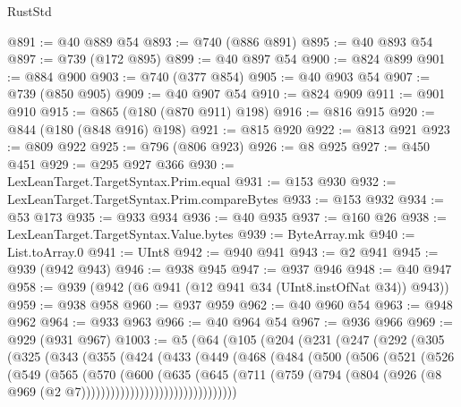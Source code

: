 \begin{lexlean}{RustStd}
\begin{coremodule}
@891 := @40 @889 @54
@893 := @740 (@886 @891)
@895 := @40 @893 @54
@897 := @739 (@172 @895)
@899 := @40 @897 @54
@900 := @824 @899
@901 := @884 @900
@903 := @740 (@377 @854)
@905 := @40 @903 @54
@907 := @739 (@850 @905)
@909 := @40 @907 @54
@910 := @824 @909
@911 := @901 @910
@915 := @865 (@180 (@870 @911) @198)
@916 := @816 @915
@920 := @844 (@180 (@848 @916) @198)
@921 := @815 @920
@922 := @813 @921
@923 := @809 @922
@925 := @796 (@806 @923)
@926 := @8 @925
@927 := @450 @451
@929 := @295 @927 @366
@930 := LexLeanTarget.TargetSyntax.Prim.equal
@931 := @153 @930
@932 := LexLeanTarget.TargetSyntax.Prim.compareBytes
@933 := @153 @932
@934 := @53 @173
@935 := @933 @934
@936 := @40 @935
@937 := @160 @26
@938 := LexLeanTarget.TargetSyntax.Value.bytes
@939 := ByteArray.mk
@940 := List.toArray.{0}
@941 := UInt8
@942 := @940 @941
@943 := @2 @941
@945 := @939 (@942 @943)
@946 := @938 @945
@947 := @937 @946
@948 := @40 @947
@958 := @939 (@942 (@6 @941 (@12 @941 @34 (UInt8.instOfNat @34)) @943))
@959 := @938 @958
@960 := @937 @959
@962 := @40 @960 @54
@963 := @948 @962
@964 := @933 @963
@966 := @40 @964 @54
@967 := @936 @966
@969 := @929 (@931 @967)
@1003 := @5
    (@64
      (@105
        (@204
          (@231
            (@247
              (@292
                (@305
                  (@325
                    (@343
                      (@355
                        (@424
                          (@433
                            (@449
                              (@468
                                (@484
                                  (@500
                                    (@506
                                      (@521
                                        (@526
                                          (@549
                                            (@565
                                              (@570
                                                (@600
                                                  (@635
                                                    (@645
                                                      (@711
                                                        (@759
                                                          (@794
                                                            (@804
                                                              (@926
                                                                (@8
                                                                  @969
                                                                  (@2
                                                                    @7))))))))))))))))))))))))))))))))

\end{coremodule}
\end{lexlean}
